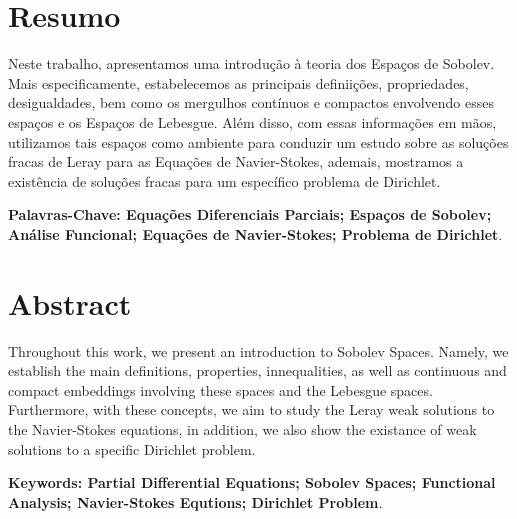 \chapter*{Resumo}

Neste trabalho, apresentamos uma introdução à teoria dos Espaços de Sobolev. Mais especificamente, estabelecemos as principais definiições, propriedades, desigualdades, bem como os mergulhos contínuos e compactos envolvendo esses espaços e os Espaços de Lebesgue. Além disso, com essas informações em mãos, utilizamos tais espaços como ambiente para conduzir um estudo sobre as soluções fracas de Leray para as Equações de Navier-Stokes, ademais, mostramos a existência de soluções fracas para um específico problema de Dirichlet.

\vfill

\noindent\textbf{Palavras-Chave: Equações Diferenciais Parciais; Espaços de Sobolev; Análise Funcional; Equações de Navier-Stokes; Problema de Dirichlet}.

\chapter*{Abstract}

Throughout this work, we present an introduction to Sobolev Spaces. Namely, we establish the main definitions, properties, innequalities, as well as continuous and compact embeddings involving these spaces and the Lebesgue spaces. Furthermore, with these concepts, we aim to study the Leray weak solutions to the Navier-Stokes equations, in addition, we also show the existance of weak solutions to a specific Dirichlet problem.

\vfill

\noindent\textbf{Keywords: Partial Differential Equations; Sobolev Spaces; Functional Analysis; Navier-Stokes Equtions; Dirichlet Problem}.